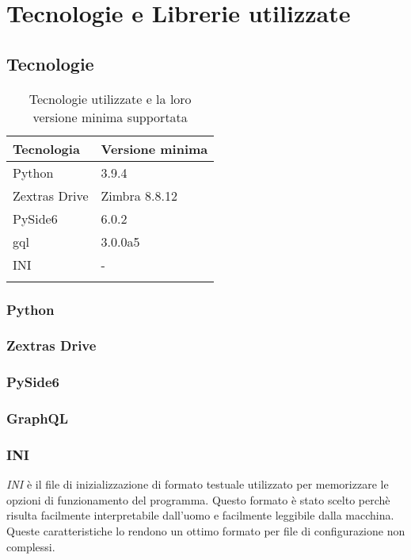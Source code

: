 \section{Tecnologie e Librerie utilizzate}

\subsection{Tecnologie}
{
	\setlength{\freewidth}{\dimexpr\textwidth-1\tabcolsep}
	\renewcommand{\arraystretch}{1.5}
	\setlength{\aboverulesep}{0pt}
	\setlength{\belowrulesep}{0pt}
	\begin{longtable}{L{.210\freewidth} L{.68\freewidth}}
		\textbf{Tecnologia} & \textbf{Versione minima} \\
		\toprule
		\endhead	
		Python & 3.9.4 \\
		Zextras Drive & Zimbra 8.8.12 \\	
		PySide6 & 6.0.2 \\
		gql & 3.0.0a5 \\
		INI & - \\
		\bottomrule
		\hiderowcolors
		\caption{Tecnologie utilizzate e la loro versione minima supportata}
	\end{longtable}
\subsubsection{Python}

\subsubsection{Zextras Drive}

\subsubsection{PySide6}

\subsubsection{GraphQL}

\subsubsection{INI}
\textit{INI} è il file di inizializzazione di formato testuale utilizzato per memorizzare le opzioni di funzionamento del programma. Questo formato è stato scelto perchè risulta facilmente interpretabile dall'uomo e facilmente leggibile dalla macchina. Queste caratteristiche lo rendono un ottimo formato per file di configurazione non complessi.

}
